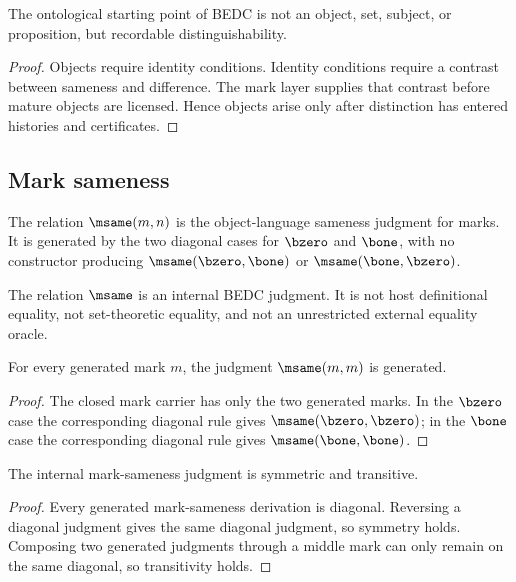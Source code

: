 \begin{corollary}
\label{cor:philosophy-starting-point-not-thing}
The ontological starting point of BEDC is not an object, set, subject,
or proposition, but recordable distinguishability.
\end{corollary}
\begin{proof}
Objects require identity conditions. Identity conditions require a
contrast between sameness and difference. The mark layer supplies that
contrast before mature objects are licensed. Hence objects arise only
after distinction has entered histories and certificates.
\end{proof}

\subsection{Mark sameness}
\label{subsec:mark-sameness}

\begin{definition}
\label{def:philosophy-internal-mark-sameness}
The relation \(\msame(m,n)\) is the object-language sameness judgment
for marks. It is generated by the two diagonal cases for \(\bzero\) and
\(\bone\), with no constructor producing \(\msame(\bzero,\bone)\) or
\(\msame(\bone,\bzero)\).
\end{definition}

\begin{definition}
\label{def:philosophy-mark-sameness-not-host-equality}
The relation \(\msame\) is an internal BEDC judgment. It is not host
definitional equality, not set-theoretic equality, and not an
unrestricted external equality oracle.
\end{definition}

\begin{theorem}
\label{thm:philosophy-mark-sameness-reflexive}
For every generated mark \(m\), the judgment \(\msame(m,m)\) is
generated.
\end{theorem}
\begin{proof}
The closed mark carrier has only the two generated marks. In the
\(\bzero\) case the corresponding diagonal rule gives
\(\msame(\bzero,\bzero)\); in the \(\bone\) case the corresponding
diagonal rule gives \(\msame(\bone,\bone)\).
\end{proof}

\begin{theorem}
\label{thm:philosophy-mark-sameness-symmetric-transitive}
The internal mark-sameness judgment is symmetric and transitive.
\end{theorem}
\begin{proof}
Every generated mark-sameness derivation is diagonal. Reversing a
diagonal judgment gives the same diagonal judgment, so symmetry holds.
Composing two generated judgments through a middle mark can only remain
on the same diagonal, so transitivity holds.
\end{proof}

